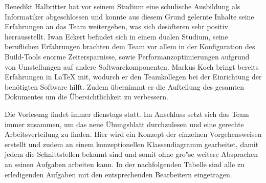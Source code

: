 Benedikt Halbritter hat vor seinem Studium eine schulische Ausbildung als Informatiker abgeschlossen und konnte aus diesem Grund gelernte Inhalte seine Erfahrungen an das Team weitergeben, was sich des\"ofteren sehr positiv herrausstellt.
Iwan Eckert befindet sich in einem dualen Studium, seine beruflichen Erfahrungen brachten dem Team vor allem in der Konfiguration des Build-Tools enorme Zeitersparnisse, sowie Performanzoptimierungen aufgrund von Umstellungen auf andere Softwarekomponenten.
Markus Koch bringt bereits Erfahrungen in LaTeX mit, wodurch er den Teamkollegen bei der Einrichtung der ben\"otigten Software hilft.
Zudem \"ubernimmt er die Aufteilung des gesamten Dokumentes um die \"Ubersichtlichkeit zu verbessern.

Die Vorlesung findet immer dienstags statt.
Im Anschluss setzt sich das Team immer zusammen, um das neue \"Ubungsblatt durchzulesen und eine gerechte Arbeitsverteilung zu finden.
Hier wird ein Konzept der einzelnen Vorgehensweisen erstellt und zudem an einem konzeptionellen Klassendiagramm gearbeitet, damit jedem die Schnittstellen bekannt sind und somit ohne gro"se weitere Absprachen an seinen Aufgaben arbeiten kann.
In der nachfolgenden Tabelle sind alle zu erledigenden Aufgaben mit den entsprechenden Bearbeitern eingetragen.


